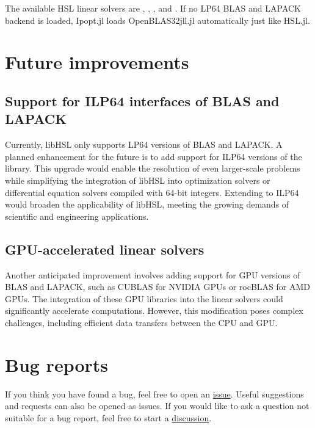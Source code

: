 \documentclass[gdweb]{geradwp}
\renewcommand{\_}{\raisebox{+0.35mm}{\textunderscore}}
\newcommand{\OpenBLASjll}{OpenBLAS32\_jll.jl\xspace}
\begin{document}
The available HSL linear solvers are , , ,  and .
If no LP64 BLAS and LAPACK backend is loaded, Ipopt.jl loads \OpenBLASjll automatically just like HSL.jl.

\section{Future improvements}

\subsection{Support for ILP64 interfaces of BLAS and LAPACK}

Currently, libHSL only supports LP64 versions of BLAS and LAPACK.
A planned enhancement for the future is to add support for ILP64 versions of the library.
This upgrade would enable the resolution of even larger-scale problems while simplifying the integration of libHSL into optimization solvers or differential equation solvers compiled with 64-bit integers.
Extending to ILP64 would broaden the applicability of libHSL, meeting the growing demands of scientific and engineering applications.

\subsection{GPU-accelerated linear solvers}

Another anticipated improvement involves adding support for GPU versions of BLAS and LAPACK, such as CUBLAS for NVIDIA GPUs or rocBLAS for AMD GPUs.
The integration of these GPU libraries into the linear solvers could significantly accelerate computations.
However, this modification poses complex challenges, including efficient data transfers between the CPU and GPU.

\section{Bug reports}

If you think you have found a bug, feel free to open an \href{https://github.com/ralna/libHSL/issues}{issue}.
Useful suggestions and requests can also be opened as issues.
If you would like to ask a question not suitable for a bug report, feel free to start a \href{https://github.com/ralna/libHSL/discussions}{discussion}.



\end{document}
